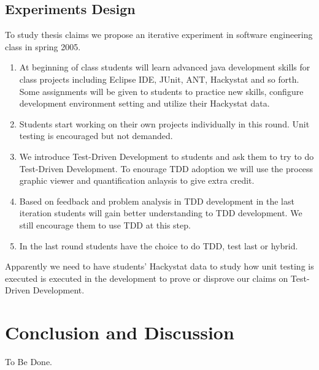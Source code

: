 \documentclass[11pt,twocolumn]{article}
\begin{document}
\subsection{Experiments Design}
To study thesis claims we propose an iterative experiment in software
engineering class in spring 2005.

\begin{enumerate}
\item At beginning of class students will learn advanced java development
  skills for class projects including Eclipse IDE, JUnit, ANT, Hackystat
  and so forth. Some assignments will be given to students to practice new
  skills, configure development environment setting and utilize their
  Hackystat data.
\item Students start working on their own projects individually in this
  round. Unit testing is encouraged but not demanded.
\item We introduce Test-Driven Development to students and ask them to try
  to do Test-Driven Development. To enourage TDD adoption we will use the
  process graphic viewer and quantification anlaysis to give extra
  credit. 
\item Based on feedback and problem analysis in TDD development in the last
  iteration students will gain better understanding to TDD development. We
  still encourage them to use TDD at this step.
\item In the last round students have the choice to do TDD, test last or
  hybrid.
\end{enumerate}

Apparently we need to have students' Hackystat data to study how unit
testing is executed is executed in the development to prove or disprove our
claims on Test-Driven Development.

\section{Conclusion and Discussion}
\label{sec:discuss}

To Be Done.


\end{document}
